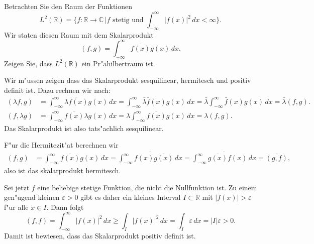 Betrachten Sie den Raum der Funktionen
\[
L^2(\mathbb R)=\biggl\{
f:\mathbb R\to\mathbb C\,\bigg|
\text{$f$ stetig und }
\int_{-\infty}^\infty |f(x)|^2\,dx<\infty
\biggr\}.
\]
Wir staten diesen Raum mit dem Skalarprodukt
\[
(f,g)=\int_{-\infty}^\infty \overline{f(x)}g(x)\,dx.
\]
Zeigen Sie, dass $L^2(\mathbb R)$ ein Pr"ahilbertraum ist.

\begin{loesung}
Wir m"ussen zeigen dass das Skalarprodukt sesquilinear, hermitesch und positiv
definit ist.
Dazu rechnen wir nach:
\begin{align*}
(\lambda f,g)
&=
\int_{-\infty}^\infty
\overline{\lambda f(x)}g(x)
\,dx
=
\int_{-\infty}^\infty
\bar \lambda \bar f(x)
g(x)
\,dx
=
\bar \lambda
\int_{-\infty}^\infty
\bar f(x) g(x)
\,dx
=\bar\lambda(f,g).
\\
(f,\lambda g)
&=
\int_{-\infty}^\infty
\overline{f(x)}\lambda g(x)
\,dx
=
\lambda
\int_{-\infty}^\infty
\overline{f(x)}g(x)
\,dx
=
\lambda(f,g).
\end{align*}
Das Skalarprodukt ist also tats"achlich sesquilinear.

F"ur die Hermitezit"at berechnen wir
\begin{align*}
(f,g)
&=
\int_{-\infty}^{\infty} \overline{f(x)} g(x)\,dx
=
\overline{
\int_{-\infty}^{\infty} f(x) \overline{g(x)}\,dx
}
=
\overline{
\int_{-\infty}^{\infty}
\overline{g(x)}
f(x)
\,dx
}
=
\overline{(g,f)},
\end{align*}
also ist das skalarprodukt hermitesch.

Sei jetzt $f$ eine beliebige stetige Funktion, die nicht die Nullfunktion
ist. Zu einem gen"ugend kleinen $\varepsilon>0$ gibt es daher ein kleines
Interval $I\subset\mathbb R$ mit $|f(x)|>\varepsilon$ f"ur alle $x\in I$.
Dann folgt
\[
(f,f)
=
\int_{-\infty}^\infty
|f(x)|^2
\,dx
\ge
\int_I|f(x)|^2\,dx
=
\int_I\varepsilon\,dx
=|I|\varepsilon >0.
\]
Damit ist bewiesen, dass das Skalarprodukt positiv definit ist.
\end{loesung}

